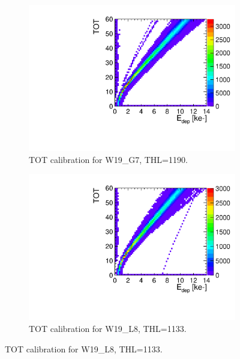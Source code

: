 \begin{figure}[htbp] \centering
  \begin{subfigure}[b]{0.45\textwidth}
    \includegraphics[width=\textwidth]{./figures/Calibration/TOTcalibration_W0019_G07_thresh1190.pdf}
    \caption{TOT calibration for W19\_G7, THL=1190.}
    \label{fig:TOTcalibW19G7}
  \end{subfigure}\hfill
  \begin{subfigure}[b]{0.45\textwidth}
    \includegraphics[width=\textwidth]{./figures/Calibration/TOTcalibration_W0019_L08_thresh1133.pdf}
    \caption{TOT calibration for W19\_L8, THL=1133.}
    \label{fig:TOTcalibW19L8}
  \end{subfigure}
\end{figure}


